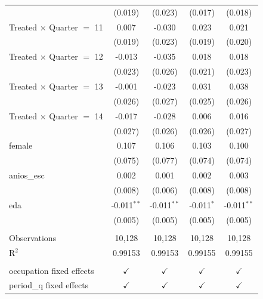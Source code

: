 \begin{longtable}{lcccc}
                                  & (0.019)                                   & (0.023)        & (0.017)      & (0.018)       \\
  Treated $\times$ Quarter $=$ 11 & 0.007                                     & -0.030         & 0.023        & 0.021         \\
                                  & (0.019)                                   & (0.023)        & (0.019)      & (0.020)       \\
  Treated $\times$ Quarter $=$ 12 & -0.013                                    & -0.035         & 0.018        & 0.018         \\
                                  & (0.023)                                   & (0.026)        & (0.021)      & (0.023)       \\
  Treated $\times$ Quarter $=$ 13 & -0.001                                    & -0.023         & 0.031        & 0.038         \\
                                  & (0.026)                                   & (0.027)        & (0.025)      & (0.026)       \\
  Treated $\times$ Quarter $=$ 14 & -0.017                                    & -0.028         & 0.006        & 0.016         \\
                                  & (0.027)                                   & (0.026)        & (0.026)      & (0.027)       \\
  female                          & 0.107                                     & 0.106          & 0.103        & 0.100         \\
                                  & (0.075)                                   & (0.077)        & (0.074)      & (0.074)       \\
  anios\_esc                      & 0.002                                     & 0.001          & 0.002        & 0.003         \\
                                  & (0.008)                                   & (0.006)        & (0.008)      & (0.008)       \\
  eda                             & -0.011$^{**}$                             & -0.011$^{**}$  & -0.011$^{*}$ & -0.011$^{**}$ \\
                                  & (0.005)                                   & (0.005)        & (0.005)      & (0.005)       \\
  \\
  Observations                    & 10,128                                    & 10,128         & 10,128       & 10,128        \\
  R$^2$                           & 0.99153                                   & 0.99153        & 0.99155      & 0.99155       \\
  \\
  occupation fixed effects        & $\checkmark$                              & $\checkmark$   & $\checkmark$ & $\checkmark$  \\
  period\_q fixed effects         & $\checkmark$                              & $\checkmark$   & $\checkmark$ & $\checkmark$  \\
\end{longtable}
